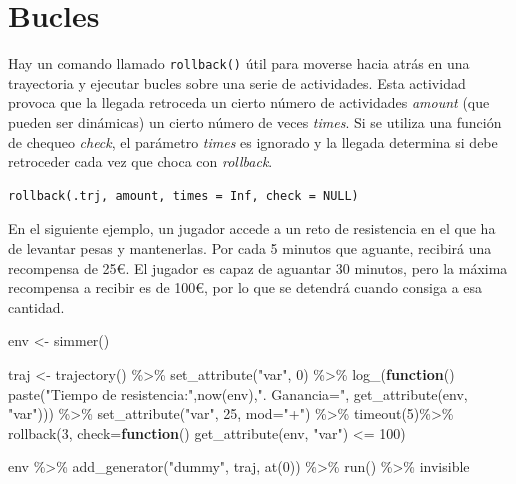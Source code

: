 \documentclass[
]{book}
\newenvironment{Shaded}{\begin{snugshade}}{\end{snugshade}}
\newcommand{\AttributeTok}[1]{\textcolor[rgb]{0.77,0.63,0.00}{#1}}
\newcommand{\ControlFlowTok}[1]{\textcolor[rgb]{0.13,0.29,0.53}{\textbf{#1}}}
\newcommand{\DecValTok}[1]{\textcolor[rgb]{0.00,0.00,0.81}{#1}}
\newcommand{\FunctionTok}[1]{\textcolor[rgb]{0.00,0.00,0.00}{#1}}
\newcommand{\NormalTok}[1]{#1}
\newcommand{\OtherTok}[1]{\textcolor[rgb]{0.56,0.35,0.01}{#1}}
\newcommand{\SpecialCharTok}[1]{\textcolor[rgb]{0.00,0.00,0.00}{#1}}
\newcommand{\StringTok}[1]{\textcolor[rgb]{0.31,0.60,0.02}{#1}}
\theoremstyle{definition}
\theoremstyle{definition}
\theoremstyle{definition}
\theoremstyle{definition}
\theoremstyle{remark}
\begin{document}
\hypertarget{bucles}{%
\section{Bucles}\label{bucles}}

Hay un comando llamado \texttt{rollback()} útil para moverse hacia atrás en una trayectoria y ejecutar bucles sobre una serie de actividades. Esta actividad provoca que la llegada retroceda un cierto número de actividades \emph{amount} (que pueden ser dinámicas) un cierto número de veces \emph{times}. Si se utiliza una función de chequeo \emph{check}, el parámetro \emph{times} es ignorado y la llegada determina si debe retroceder cada vez que choca con \emph{rollback}.

\begin{verbatim}
rollback(.trj, amount, times = Inf, check = NULL)
\end{verbatim}

En el siguiente ejemplo, un jugador accede a un reto de resistencia en el que ha de levantar pesas y mantenerlas. Por cada 5 minutos que aguante, recibirá una recompensa de 25€. El jugador es capaz de aguantar 30 minutos, pero la máxima recompensa a recibir es de 100€, por lo que se detendrá cuando consiga a esa cantidad.

\begin{Shaded}
\begin{Highlighting}[]
\NormalTok{env }\OtherTok{\textless{}{-}} \FunctionTok{simmer}\NormalTok{()}

\NormalTok{traj }\OtherTok{\textless{}{-}} \FunctionTok{trajectory}\NormalTok{() }\SpecialCharTok{\%\textgreater{}\%}
  \FunctionTok{set\_attribute}\NormalTok{(}\StringTok{"var"}\NormalTok{, }\DecValTok{0}\NormalTok{) }\SpecialCharTok{\%\textgreater{}\%}
  \FunctionTok{log\_}\NormalTok{(}\ControlFlowTok{function}\NormalTok{()}
    \FunctionTok{paste}\NormalTok{(}\StringTok{"Tiempo de resistencia:"}\NormalTok{,}\FunctionTok{now}\NormalTok{(env),}\StringTok{". Ganancia="}\NormalTok{, }\FunctionTok{get\_attribute}\NormalTok{(env, }\StringTok{"var"}\NormalTok{))) }\SpecialCharTok{\%\textgreater{}\%}
  \FunctionTok{set\_attribute}\NormalTok{(}\StringTok{"var"}\NormalTok{, }\DecValTok{25}\NormalTok{, }\AttributeTok{mod=}\StringTok{"+"}\NormalTok{) }\SpecialCharTok{\%\textgreater{}\%}
  \FunctionTok{timeout}\NormalTok{(}\DecValTok{5}\NormalTok{)}\SpecialCharTok{\%\textgreater{}\%}
  \FunctionTok{rollback}\NormalTok{(}\DecValTok{3}\NormalTok{, }\AttributeTok{check=}\ControlFlowTok{function}\NormalTok{() }\FunctionTok{get\_attribute}\NormalTok{(env, }\StringTok{"var"}\NormalTok{) }\SpecialCharTok{\textless{}=} \DecValTok{100}\NormalTok{) }

\NormalTok{env }\SpecialCharTok{\%\textgreater{}\%}
  \FunctionTok{add\_generator}\NormalTok{(}\StringTok{"dummy"}\NormalTok{, traj, }\FunctionTok{at}\NormalTok{(}\DecValTok{0}\NormalTok{)) }\SpecialCharTok{\%\textgreater{}\%}
  \FunctionTok{run}\NormalTok{() }\SpecialCharTok{\%\textgreater{}\%}\NormalTok{ invisible}
\end{Highlighting}
\end{Shaded}
\end{document}
